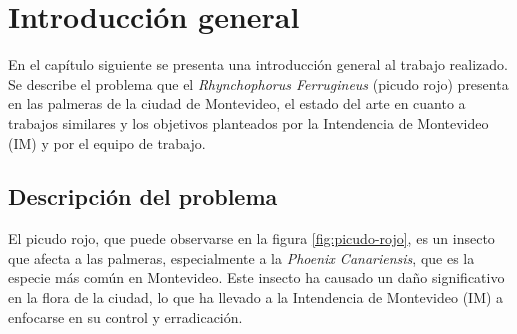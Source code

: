 
\chapter{Introducción general} %

\label{Chapter1} %
\label{IntroGeneral}

En el capítulo siguiente se presenta una introducción general al trabajo realizado. Se describe el problema que el \textit{Rhynchophorus Ferrugineus} (picudo rojo) presenta en las palmeras de la ciudad de Montevideo, el estado del arte en cuanto a trabajos similares y los objetivos planteados por la Intendencia de Montevideo (IM) y por el equipo de trabajo.


\newcommand{\keyword}[1]{\textbf{#1}}
\newcommand{\tabhead}[1]{\textbf{#1}}
\newcommand{\code}[1]{\texttt{#1}}
\newcommand{\file}[1]{\texttt{\bfseries#1}}
\newcommand{\option}[1]{\texttt{\itshape#1}}
\newcommand{\grados}{$^{\circ}$}
\newcommand{\comment}[1]{}

\section{Descripción del problema}
\label{sec:descProblema}

El picudo rojo, que puede observarse en la figura \ref{fig:picudo-rojo}, es un insecto que afecta a las palmeras, especialmente a la \textit{Phoenix Canariensis}, que es la especie más común en Montevideo. Este insecto ha causado un daño significativo en la flora de la ciudad, lo que ha llevado a la Intendencia de Montevideo (IM) a enfocarse en su control y erradicación.

